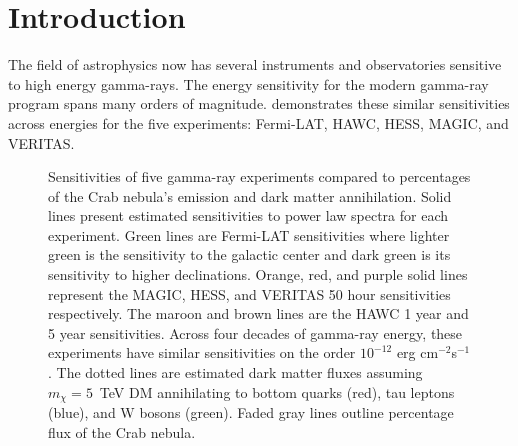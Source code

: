 \section{Introduction} \label{sec:gd_intro}

The field of astrophysics now has several instruments and observatories sensitive to high energy gamma-rays.
The energy sensitivity for the modern gamma-ray program spans many orders of magnitude.
 demonstrates these similar sensitivities across energies for the five experiments: Fermi-LAT, HAWC, HESS, MAGIC, and VERITAS.

\begin{figure}[ht]
    \caption{\ns Sensitivities of five gamma-ray experiments compared to percentages of the Crab nebula's emission and dark matter annihilation. Solid lines present estimated sensitivities to power law spectra \fu for each experiment. Green lines are Fermi-LAT sensitivities where lighter green is the sensitivity to the galactic center and dark green is its sensitivity to higher declinations. Orange, red, and purple solid lines represent the MAGIC, HESS, and VERITAS 50 hour sensitivities respectively. The maroon and brown lines are the HAWC 1 year and 5 year sensitivities. Across four decades of gamma-ray energy, these experiments have similar sensitivities on the order $10^{-12}$ erg cm$^{-2}$s$^{-1}$. The dotted lines are estimated dark matter fluxes assuming $m_{\chi} = 5$~TeV DM annihilating to bottom quarks (red), tau leptons (blue), and W bosons (green). Faded gray lines outline percentage flux of the Crab nebula.}
    \label{fig:gd_motivation}
\end{figure}

